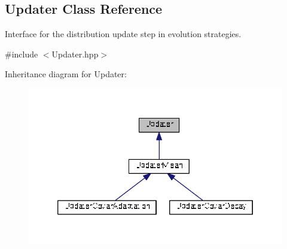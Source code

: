 \hypertarget{classDmpBbo_1_1Updater}{\subsection{Updater Class Reference}
\label{classDmpBbo_1_1Updater}
}


Interface for the distribution update step in evolution strategies.  




{\ttfamily \#include $<$Updater.\+hpp$>$}



Inheritance diagram for Updater\+:
\nopagebreak
\begin{figure}[H]
\begin{center}
\leavevmode
\includegraphics[width=346pt]{classDmpBbo_1_1Updater__inherit__graph}
\end{center}
\end{figure}
